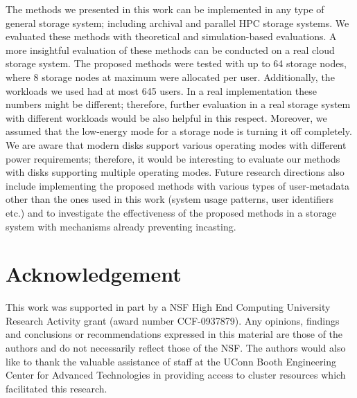 \documentclass[preprint,12pt]{elsarticle}
\begin{document}
The methods we presented in this work can be implemented in any type of general
storage system; including archival and parallel HPC storage systems. We evaluated
these methods with theoretical and simulation-based evaluations. A more insightful
evaluation of these methods can be conducted on a real cloud storage system. The
proposed methods were tested with up to 64 storage nodes, where 8 storage nodes at
maximum were allocated per user. Additionally, the workloads we used had at most
645 users. In a real implementation these numbers might be different; therefore,
further evaluation in a real storage system with different workloads would be also
helpful in this respect. Moreover, we assumed that the low-energy mode for a
storage node is turning it off completely. We are aware that modern disks support
various operating modes with different power requirements; therefore, it would be
interesting to evaluate our methods with disks supporting multiple operating modes.
Future research directions also include implementing the proposed methods with various
types of user-metadata other than the ones used in this work (system usage patterns,
user identifiers etc.) and to investigate the effectiveness of the proposed methods
in a storage system with mechanisms already preventing incasting.

\section{Acknowledgement}
\label{ack}
This work was supported in part by a NSF High End Computing University
Research Activity grant (award number CCF-0937879). Any opinions,
findings and conclusions or recommendations expressed in this material
are those of the authors and do not necessarily reflect those of the
NSF. The authors would also like to thank the valuable assistance of staff
at the UConn Booth Engineering Center for Advanced Technologies in
providing access to cluster resources which facilitated this research.



\end{document}
